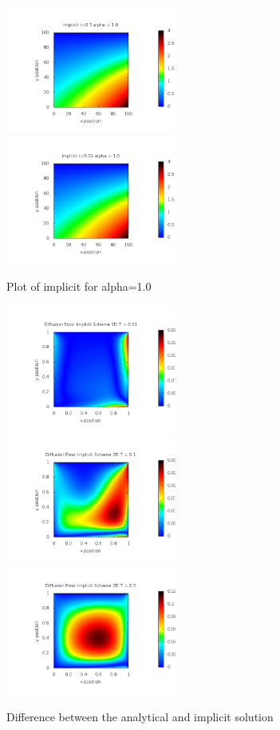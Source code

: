 \documentclass[a4wide,12pt]{article}
\begin{document}
 \begin{figure}[p]
 \includegraphics[width=0.5\textwidth]{test}
 \includegraphics[width=0.5\textwidth]{test2}
 \caption{Plot of implicit for alpha=1.0}
 \label{fig:12}
 \end{figure}
 
 \begin{figure}[p]
 \includegraphics[width=0.5\textwidth]{ErrorImplicit2DT0_01}
 \includegraphics[width=0.5\textwidth]{ErrorImplicit2DT0_1}
 \includegraphics[width=0.5\textwidth]{ErrorImplicit2DT0_5}
 \caption{Difference between the analytical and implicit solution}
 \label{fig:13}
 \end{figure}
 
\end{document}
